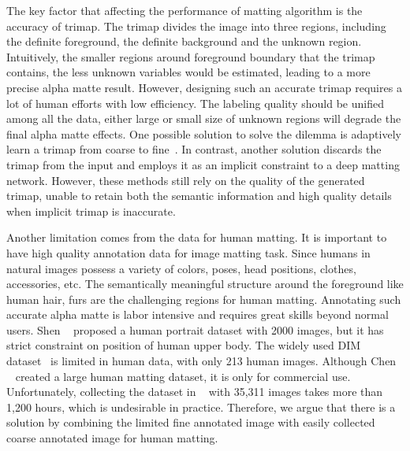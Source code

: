 \documentclass[10pt,twocolumn,letterpaper]{article}
\begin{document}
The key factor that affecting the performance of matting algorithm is the accuracy of trimap. The trimap divides the image into three regions, including the definite foreground, the definite background and the unknown region. Intuitively, the smaller regions around foreground boundary that the trimap contains, the less unknown variables would be estimated, leading to a more precise alpha matte result. However, designing such an accurate trimap requires a lot of human efforts with low efficiency. The labeling quality should be unified among all the data, either large or small size of unknown regions will degrade the final alpha matte effects. One possible solution to solve the dilemma is adaptively learn a trimap from coarse to fine~\cite{shen2016deep,Cai_2019_ICCV}. In contrast, another solution discards the trimap from the input and employs it as an implicit constraint to a deep matting network\cite{chen2018semantic,Zhang_2019_CVPR}. However, these methods still rely on the quality of the generated trimap, unable to retain both the semantic information and high quality details when implicit trimap is inaccurate.

Another limitation comes from the data for human matting. It is important to have high quality annotation data for image matting task. Since humans in natural images possess a variety of colors, poses, head positions, clothes, accessories, etc. The semantically meaningful structure around the foreground like human hair, furs are the challenging regions for human matting.  Annotating such accurate alpha matte is labor intensive and requires great skills beyond normal users. Shen \etal~\cite{shen2016deep} proposed a human portrait dataset with 2000 images, but it has strict constraint on position of human upper body. The widely used DIM dataset~\cite{xu2017deep} is limited in human data, with only 213 human images. Although Chen \etal~\cite{chen2018semantic} created a large human matting dataset, it is only for commercial use. Unfortunately, collecting the dataset in ~\cite{chen2018semantic} with 35,311 images takes more than 1,200 hours, which is undesirable in practice. Therefore, we argue that there is a solution by combining the limited fine annotated image with easily collected coarse annotated image for human matting.
\end{document}
